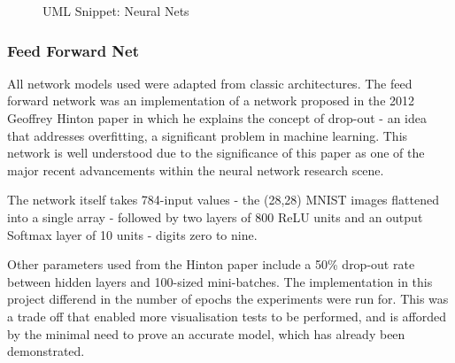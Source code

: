 \documentclass[a4paper,11pt,titlepage]{article}
\begin{document}
	\begin{figure}[H]
    			\caption{UML Snippet: Neural Nets}%
	\end{figure}	


		\subsubsection{Feed Forward Net}
		All network models used were adapted from classic architectures. The feed forward network was an implementation of a network proposed in the 2012 Geoffrey Hinton paper in which he explains the concept of drop-out \cite{Hinton2012} - an idea that addresses overfitting,  a significant problem in machine learning. This network is well understood due to the significance of this paper as one of the major recent advancements within the neural network research scene.
	
	\begin{figure}[H]
	\end{figure}

		\par 
		The network itself takes 784-input values - the (28,28) MNIST images flattened into a single array - followed by two layers of 800 ReLU units and an output Softmax layer of 10 units - digits zero to nine. 
		\par 
		Other parameters used from the Hinton paper include a 50\% drop-out rate between hidden layers and 100-sized mini-batches. The implementation in this project differend in the number of epochs the experiments were run for. This was a trade off that enabled more visualisation tests to be performed, and is afforded by the minimal need to prove an accurate model, which has already been demonstrated.
		\\\
\end{document}
